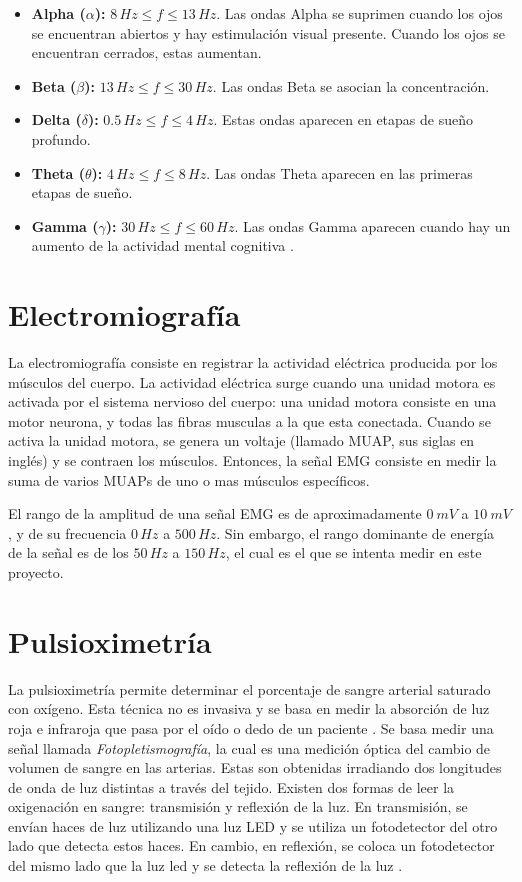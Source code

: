 \begin{itemize}
 \item \textbf{Alpha ($\alpha$):} $ 8 \, Hz \leq f \leq 13 \, Hz$. Las ondas Alpha se suprimen cuando los ojos se encuentran abiertos y hay estimulación visual presente. Cuando los ojos se encuentran cerrados, estas aumentan.
 \item \textbf{Beta ($\beta$):} $ 13 \, Hz \leq f \leq 30 \, Hz$. Las ondas Beta se asocian la concentración.
 \item \textbf{Delta ($\delta$):} $ 0.5 \, Hz \leq f \leq 4 \, Hz$. Estas ondas aparecen en etapas de sueño profundo.
 \item \textbf{Theta ($\theta$):} $ 4 \, Hz \leq f \leq 8 \, Hz$. Las ondas Theta aparecen en las primeras etapas de sueño.
 \item \textbf{Gamma ($\gamma$):} $ 30 \, Hz \leq f \leq 60 \, Hz$. Las ondas Gamma aparecen cuando hay un aumento de la actividad mental cognitiva \cite{neural-eng}.
\end{itemize}

\section{Electromiografía}

La electromiografía consiste en registrar la actividad eléctrica producida por los músculos del cuerpo. La actividad eléctrica surge cuando una unidad motora es activada por el sistema nervioso del cuerpo: una unidad motora consiste en una motor neurona, y todas las fibras musculas a la que esta conectada.  Cuando se activa la unidad motora, se genera un voltaje (llamado MUAP, sus siglas en inglés) y se contraen los músculos.  Entonces, la señal EMG consiste en medir la suma de varios MUAPs de uno o mas músculos específicos.

El rango de la amplitud de una señal EMG es de aproximadamente $0\ mV$ a $10\ mV$, y de su frecuencia $0\, Hz$ a $500\, Hz$.  Sin embargo, el rango dominante de energía de la señal es de los $50\, Hz$ a $150\, Hz$, el cual es el que se intenta medir en este proyecto.

\section{Pulsioximetría}

La pulsioximetría permite determinar el porcentaje de sangre arterial saturado con oxígeno. Esta técnica no es invasiva y se basa en medir la absorción de luz roja e infraroja que pasa por el oído o dedo de un  paciente \cite{spo2-1}. Se basa medir una señal llamada \emph{Fotopletismografía}, la cual es una medición óptica del cambio de volumen de sangre en las arterias. Estas son obtenidas irradiando dos longitudes de onda de luz distintas a través del tejido. Existen dos formas de leer la oxigenación en sangre: transmisión y reflexión de la luz. En transmisión, se envían haces de luz utilizando una luz LED y se utiliza un fotodetector del otro lado que detecta estos haces. En cambio, en reflexión, se coloca un fotodetector del mismo lado que la luz led y se detecta la reflexión de la luz \cite{spo2-2}.

